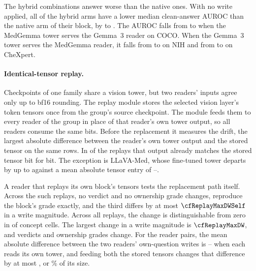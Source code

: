 The hybrid combinations answer worse than the native ones. With no write applied, all \cfSwapAnsWorse{} of the \cfSwapAnsArms{} hybrid arms have a lower median clean-answer AUROC than the native arm of their block, by \cfSwapAnsDropMin{} to \cfSwapAnsDropMax{}. The AUROC falls from \cfSwapAnsNativeGemCoco{} to \cfSwapAnsHybridGemCoco{} when the MedGemma tower serves the Gemma~3 reader on COCO. When the Gemma~3 tower serves the MedGemma reader, it falls from \cfSwapAnsNativeMedNih{} to \cfSwapAnsHybridMedNih{} on NIH and from \cfSwapAnsNativeMedChex{} to \cfSwapAnsHybridMedChex{} on CheXpert.

\paragraph{Identical-tensor replay.} Checkpoints of one family share a vision tower, but two readers' inputs agree only up to bf16 rounding. The replay module stores the selected vision layer's token tensors once from the group's source checkpoint. The module feeds them to every reader of the group in place of that reader's own tower output, so all readers consume the same bits. Before the replacement it measures the drift, the largest absolute difference between the reader's own tower output and the stored tensor on the same rows. In \cfReplayDriftZero{} of the \cfReplayBlocks{} replays that output already matches the stored tensor bit for bit. The exception is LLaVA-Med, whose fine-tuned tower departs by up to \cfReplayDriftMax{} against a mean absolute tensor entry of \cfReplayTensorMin{}--\cfReplayTensorMax{}.

A reader that replays its own block's tensors tests the replacement path itself. Across the \cfReplaySelf{} such replays, no verdict and no ownership grade changes, \cfReplaySelfExact{} reproduce the block's grade exactly, and the third differs by at most $\cfReplayMaxDWSelf$ in a write magnitude. Across all \cfReplayBlocks{} replays, the change is distinguishable from zero in \cfReplayMoved{} of \cfReplayCells{} concept cells. The largest change in a write magnitude is $\cfReplayMaxDW$, and \cfReplayVerdictChanges{} verdicts and \cfReplayOwnedChanges{} ownership grades change. For the \cfReplayPairs{} reader pairs, the mean absolute difference between the two readers' own-question writes is \cfReplayPairOwnMin{}--\cfReplayPairOwnMax{} when each reads its own tower, and feeding both the stored tensors changes that difference by at most \cfReplayChangeMax{}, or \cfReplayRelMax\% of its size.

